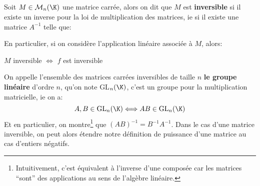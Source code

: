 \subsection*{}

Soit \(M \in \mathcal{M}_n(\K)\) une matrice carrée, alors on dit que \(M\) est \textbf{inversible} si il existe un inverse pour la loi de multiplication des matrices, ie si il existe une matrice \(A^{-1}\) telle que:

En particulier, si on considère l'application linéaire associée à \(M\), alors:
\begin{center}
   \(M\) inversible \(\Longleftrightarrow\) \(f\) est inversible
\end{center}

On appelle l'ensemble des matrices carrées inversibles de taille \(n\) \textbf{le groupe linéaire} d'ordre \(n\), qu'on note GL\(_n(\K)\), c'est un groupe pour la multiplication matricielle, ie on a:
\[
   A, B \in \text{GL}_n(\K) \Longleftrightarrow AB \in \text{GL}_n(\K)
\]
Et en particulier, on montre\footnote[1]{Intuitivement, c'est équivalent à l'inverse d'une composée car les matrices ``sont'' des applications au sens de l'algèbre linéaire.} que \((AB)^{-1} = B^{-1}A^{-1}\). Dans le cas d'une matrice inversible, on peut alors étendre notre définition de puissance d'une matrice au cas d'entiers négatifs.\<


